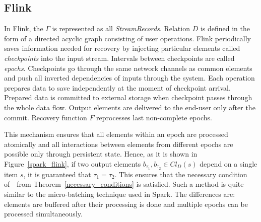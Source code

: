 
\subsection{Flink}

In Flink, the  $\Gamma$ is represented as all {\em StreamRecords}. Relation $D$ is defined in the form of a directed acyclic graph consisting of user operations. 
Flink periodically saves information needed for recovery by injecting particular elements called {\em checkpoints} into the input stream. 
Intervals  between checkpoints are called {\em epochs}. Checkpoints go through the same network channels as common elements and push all inverted dependencies of inputs through the system. 
Each operation prepares data to save independently at the moment of checkpoint arrival. Prepared data is committed to external storage when checkpoint passes through the whole data flow. Output elements are delivered to the end-user only after the commit. 
Recovery function $F$ reprocesses last non-complete epochs.

This mechanism ensures that all elements within an epoch are processed atomically and all interactions between elements from different epochs are possible only through persistent state. 
Hence, as it is shown in Figure~\ref{spark_flink},
 if two output elements $b_{\tau_1},b_{\tau_2} \in Cl_D(s)$ depend on a single item $s$, 
 it is guaranteed that $\tau_1=\tau_2$. 
This ensures that the necessary condition of~\eo\ from Theorem~\ref{necessary_conditions} is satisfied. 
Such a method is quite similar to the micro-batching technique used in Spark. 
The differences are: elements are buffered after their processing is done and  multiple epochs can be processed simultaneously. 
